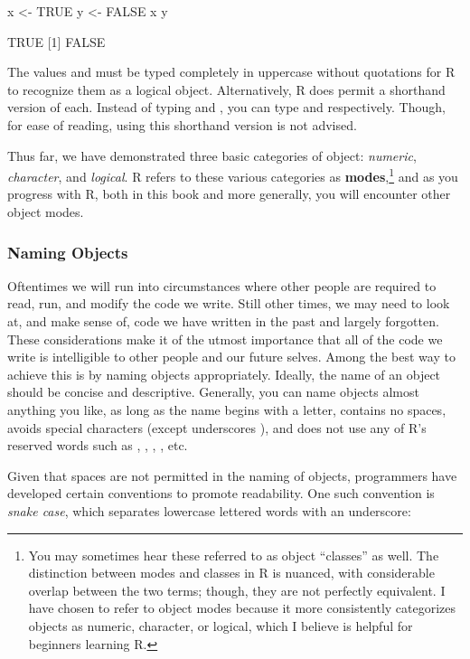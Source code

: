 \begin{inR}
x <- TRUE
y <- FALSE
x
y
\end{inR}

\begin{outR}
[1] TRUE
[1] FALSE
\end{outR}

The values  and  must be typed completely in uppercase without quotations for R to recognize them as a logical object.  Alternatively, R does permit a shorthand version of each.  Instead of typing  and , you can type  and  respectively.  Though, for ease of reading, using this shorthand version is not advised.

Thus far, we have demonstrated three basic categories of object: \textit{numeric}, \textit{character}, and \textit{logical}.  R refers to these various categories as \textbf{modes},\footnote{You may sometimes hear these referred to as object ``classes'' as well. The distinction between modes and classes in R is nuanced, with considerable overlap between the two terms; though, they are not perfectly equivalent. I have chosen to refer to object modes because it more consistently categorizes objects as numeric, character, or logical, which I believe is helpful for beginners learning R.} and as you progress with R, both in this book and more generally, you will encounter other object modes. 

\subsubsection{Naming Objects}
\label{sec:namingObjects}

Oftentimes we will run into circumstances where other people are required to read, run, and modify the code we write.  Still other times, we may need to look at, and make sense of, code we have written in the past and largely forgotten. These considerations make it of the utmost importance that all of the code we write is intelligible to other people and our future selves. Among the best way to achieve this is by naming objects appropriately. Ideally, the name of an object should be concise and descriptive. Generally, you can name objects almost anything you like, as long as the name begins with a letter, contains no spaces, avoids special characters (except underscores \R{\_}), and does not use any of R's \gls{reserved words} such as , , , , etc.

Given that spaces are not permitted in the naming of objects, programmers have developed certain conventions to promote readability. One such convention is \textit{snake case}, which separates lowercase lettered words with an underscore:


